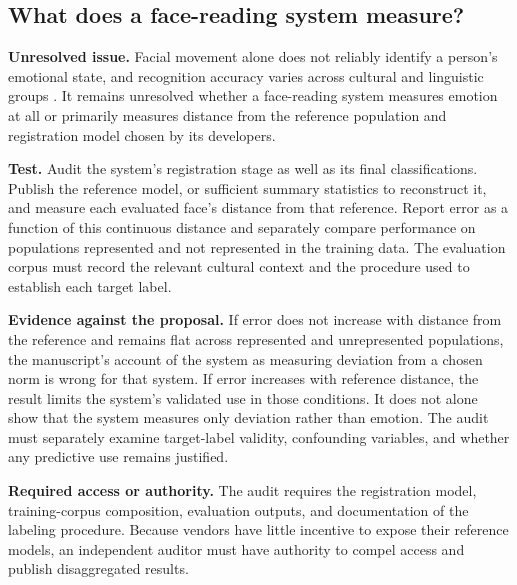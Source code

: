 \subsection*{What does a face-reading system measure?}
\label{sec:A.face}
\textbf{Unresolved issue.}
Facial movement alone does not reliably identify a person's emotional state, and recognition accuracy varies across cultural and linguistic groups \autocite{barrett2019emotional,elfenbein2002universality}. It remains unresolved whether a face-reading system measures emotion at all or primarily measures distance from the reference population and registration model chosen by its developers.

\textbf{Test.}
Audit the system's registration stage as well as its final classifications. Publish the reference model, or sufficient summary statistics to reconstruct it, and measure each evaluated face's distance from that reference. Report error as a function of this continuous distance and separately compare performance on populations represented and not represented in the training data. The evaluation corpus must record the relevant cultural context and the procedure used to establish each target label.

\textbf{Evidence against the proposal.}
If error does not increase with distance from the reference and remains flat across represented and unrepresented populations, the manuscript's account of the system as measuring deviation from a chosen norm is wrong for that system. If error increases with reference distance, the result limits the system's validated use in those conditions. It does not alone show that the system measures only deviation rather than emotion. The audit must separately examine target-label validity, confounding variables, and whether any predictive use remains justified.

\textbf{Required access or authority.}
The audit requires the registration model, training-corpus composition, evaluation outputs, and documentation of the labeling procedure. Because vendors have little incentive to expose their reference models, an independent auditor must have authority to compel access and publish disaggregated results.
